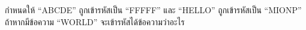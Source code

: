 \question กำหนดให้ ``ABCDE'' ถูกเข้ารหัสเป็น ``FFFFF'' และ ``HELLO'' ถูกเข้ารหัสเป็น ``MIONP''
ถ้าหากมีข้อความ ``WORLD'' จะเข้ารหัสได้ข้อความว่าอะไร
\newline
{}
